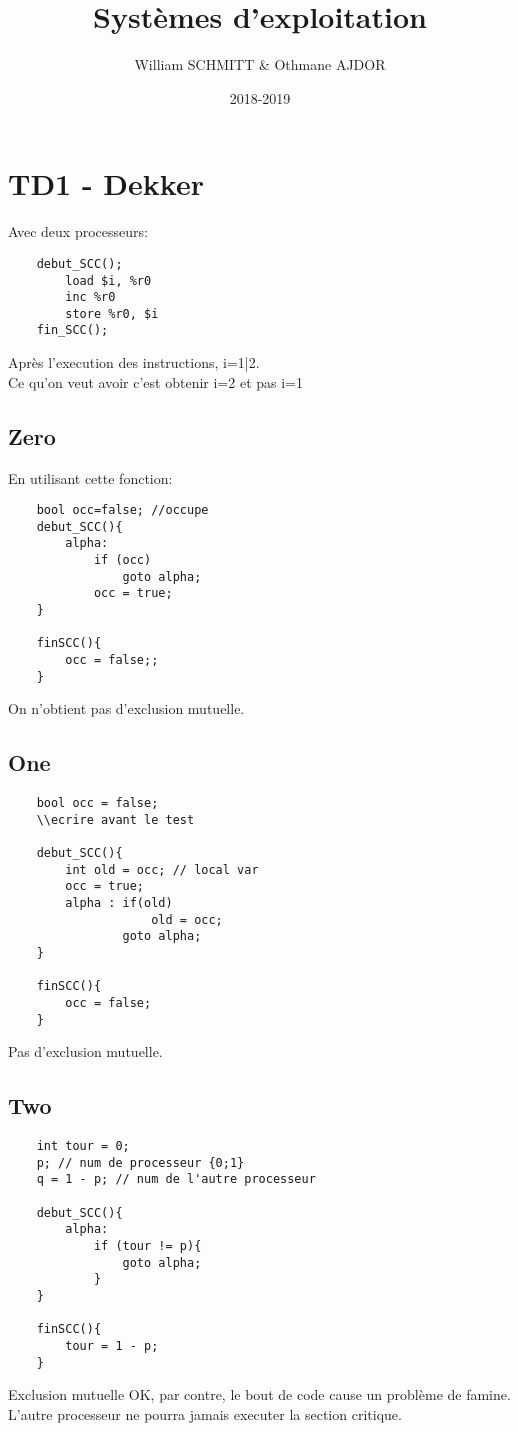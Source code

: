 \documentclass[11pt]{article}
\title{Systèmes d'exploitation}
\author{William SCHMITT \& Othmane AJDOR}
\date{2018-2019}
\begin{document}
\maketitle

\section{TD1 - Dekker}
Avec deux processeurs:
\begin{verbatim}
	debut_SCC();
		load $i, %r0
		inc %r0
		store %r0, $i
	fin_SCC();
\end{verbatim}
Après l'execution des instructions, i=1|2.\\
Ce qu'on veut avoir c'est obtenir i=2 et pas i=1

\subsection{Zero}
En utilisant cette fonction:
\begin{verbatim}
	bool occ=false; //occupe
	debut_SCC(){
		alpha: 
			if (occ) 
				goto alpha; 
			occ = true;
	}

	finSCC(){
		occ = false;;
	}
\end{verbatim}
On n'obtient pas d'exclusion mutuelle.

\pagebreak

\subsection{One}
\begin{verbatim}
	bool occ = false;
	\\ecrire avant le test
	
	debut_SCC(){
		int old = occ; // local var
		occ = true;
		alpha : if(old)
					old = occ;
				goto alpha;
	}

	finSCC(){
		occ = false;
	}
\end{verbatim}
Pas d'exclusion mutuelle.

\subsection{Two}
\begin{verbatim}
	int tour = 0;
	p; // num de processeur {0;1}
	q = 1 - p; // num de l'autre processeur

	debut_SCC(){
		alpha:
			if (tour != p){
				goto alpha;
			}
	}

	finSCC(){
		tour = 1 - p;
	}
\end{verbatim}
Exclusion mutuelle OK, par contre, le bout de code cause un problème de famine.\\
L'autre processeur ne pourra jamais executer la section critique.
\end{document}
